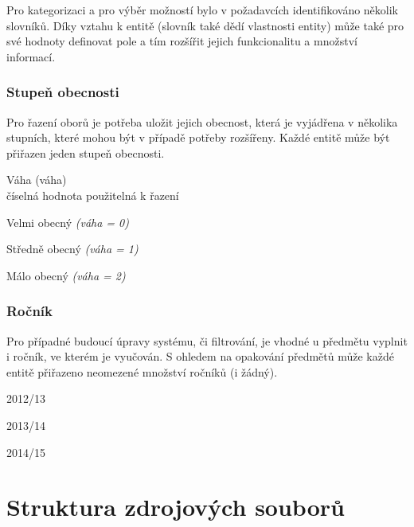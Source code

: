Pro kategorizaci a pro výběr možností bylo v požadavcích identifikováno několik slovníků. Díky vztahu k entitě (slovník také dědí vlastnosti entity) může také pro své hodnoty definovat pole a tím rozšířit jejich funkcionalitu a množství informací.

\subsubsection*{Stupeň obecnosti}
Pro řazení oborů je potřeba uložit jejich obecnost, která je vyjádřena v několika stupních, které mohou být v případě potřeby rozšířeny. Každé entitě může být přiřazen jeden stupeň obecnosti.

\begin{list}{-}{Pole}
  \item Váha (váha) \hfill \\
    číselná hodnota použitelná k řazení
\end{list}

\begin{list}{-}{Hodnoty}
  \item Velmi obecný \emph{(váha = 0)} 
  \item Středně obecný \emph{(váha = 1)}
  \item Málo obecný \emph{(váha = 2)}
\end{list}

\subsubsection*{Ročník}
Pro případné budoucí úpravy systému, či filtrování, je vhodné u předmětu vyplnit i ročník, ve kterém je vyučován. S ohledem na opakování předmětů může každé entitě přiřazeno neomezené množství ročníků (i žádný). 

\begin{list}{-}{Hodnoty}
  \item 2012/13
  \item 2013/14
  \item 2014/15
\end{list}

\section{Struktura zdrojových souborů}

